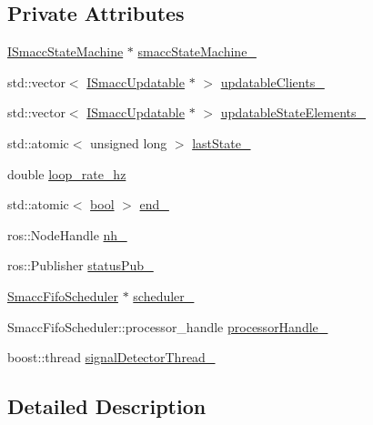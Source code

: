 \subsection*{Private Attributes}
\begin{DoxyCompactItemize}
\item 
\hyperlink{classsmacc_1_1ISmaccStateMachine}{I\+Smacc\+State\+Machine} $\ast$ \hyperlink{classsmacc_1_1SignalDetector_a46025de6ac7b5980e22144f9703236a4}{smacc\+State\+Machine\+\_\+}
\item 
std\+::vector$<$ \hyperlink{classsmacc_1_1ISmaccUpdatable}{I\+Smacc\+Updatable} $\ast$ $>$ \hyperlink{classsmacc_1_1SignalDetector_a01a457b4ec935473d6426efb7b87e683}{updatable\+Clients\+\_\+}
\item 
std\+::vector$<$ \hyperlink{classsmacc_1_1ISmaccUpdatable}{I\+Smacc\+Updatable} $\ast$ $>$ \hyperlink{classsmacc_1_1SignalDetector_a07a5e7bb00c348435d954e22682fa610}{updatable\+State\+Elements\+\_\+}
\item 
std\+::atomic$<$ unsigned long $>$ \hyperlink{classsmacc_1_1SignalDetector_a72293ed0e98f4200fbe75b53f1e41eab}{last\+State\+\_\+}
\item 
double \hyperlink{classsmacc_1_1SignalDetector_a41a2ae4262ed350f46d8b886bdc1dfa5}{loop\+\_\+rate\+\_\+hz}
\item 
std\+::atomic$<$ \hyperlink{classbool}{bool} $>$ \hyperlink{classsmacc_1_1SignalDetector_aaee266393c01693528a2d74b1f2354a2}{end\+\_\+}
\item 
ros\+::\+Node\+Handle \hyperlink{classsmacc_1_1SignalDetector_a5c416677fd537afc79f2fbc2e68b2dee}{nh\+\_\+}
\item 
ros\+::\+Publisher \hyperlink{classsmacc_1_1SignalDetector_ae065bbd4e699e5fce00fbc508dedd4c1}{status\+Pub\+\_\+}
\item 
\hyperlink{smacc__fifo__scheduler_8h_a0063e275231c80d5f97df21d17257bf7}{Smacc\+Fifo\+Scheduler} $\ast$ \hyperlink{classsmacc_1_1SignalDetector_adaee5b9b91d0e6305dc1ab30f7ab566d}{scheduler\+\_\+}
\item 
Smacc\+Fifo\+Scheduler\+::processor\+\_\+handle \hyperlink{classsmacc_1_1SignalDetector_a9a77dc9f0e9f8f56dff5e76077abcb78}{processor\+Handle\+\_\+}
\item 
boost\+::thread \hyperlink{classsmacc_1_1SignalDetector_a4346a400cd37eafc5d1d2e63d975785e}{signal\+Detector\+Thread\+\_\+}
\end{DoxyCompactItemize}


\subsection{Detailed Description}


